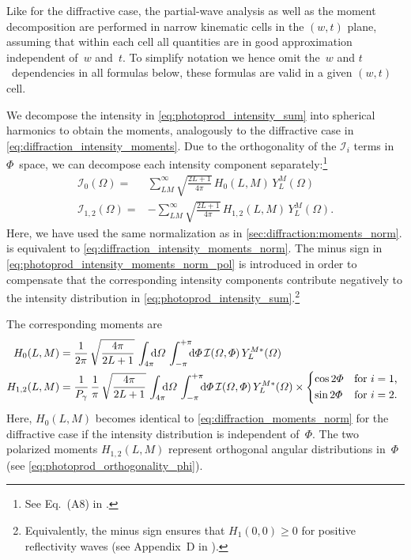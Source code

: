 Like for the diffractive case, the partial-wave analysis as well as
the moment decomposition are performed in narrow kinematic cells in
the $(w, t)$ plane, assuming that within each cell all quantities are
in good approximation independent of~$w$ and~$t$.  To simplify
notation we hence omit the~$w$ and $t$~dependencies in all formulas
below, \ie these formulas are valid in a given $(w, t)$ cell.

We decompose the intensity in \cref{eq:photoprod_intensity_sum} into
spherical harmonics to obtain the moments, analogously to the
diffractive case in \cref{eq:diffraction_intensity_moments}.  Due to
the orthogonality of the $\mathcal{I}_i$ terms in $\Phi$~space, we can
decompose each intensity component separately:\footnote{See Eq.~(A8)
in .}
\begin{align}
  \label{eq:photoprod_intensity_moments_norm_unpol}
  \mathcal{I}_0(\Omega)
  ={}& \sum_{L M}^\infty \sqrt{\frac{2 L + 1}{4 \pi}}\, H_0(L, M)\, Y_L^M(\Omega)
  \\
  \label{eq:photoprod_intensity_moments_norm_pol}
  \mathcal{I}_{1, 2}(\Omega)
  ={}& -\sum_{L M}^\infty \sqrt{\frac{2 L + 1}{4 \pi}}\, H_{1, 2}(L, M)\, Y_L^M(\Omega).
\end{align}
Here, we have used the same normalization as in
\cref{sec:diffraction:moments_norm}.
 is equivalent to
\cref{eq:diffraction_intensity_moments_norm}.  The minus sign in
\cref{eq:photoprod_intensity_moments_norm_pol} is introduced in order
to compensate that the corresponding intensity components contribute
negatively to the intensity distribution in
\cref{eq:photoprod_intensity_sum}.\footnote{Equivalently, the minus
sign ensures that $H_1(0, 0) \geq 0$ for positive reflectivity waves
(see Appendix~D in ).}

The corresponding moments are
\begin{align}
  \label{eq:photoprod_moments_norm_unpol}
  H_0(L, M)
  ={}& \frac{1}{2 \pi}\, \sqrt{\frac{4 \pi}{2 L + 1}}\, \int_{4 \pi}\!\!\! \dif{\Omega}\, \int_{-\pi}^{+\pi}\!\!\! \dif{\Phi}\,
  \mathcal{I}(\Omega, \Phi)\, Y_L^{M *}(\Omega)
  \\
  \label{eq:photoprod_moments_norm_pol}
  H_{1, 2}(L, M)
  ={}& \frac{1}{P_\gamma}\, \frac{1}{\pi}\, \sqrt{\frac{4 \pi}{2 L + 1}}\, \int_{4 \pi}\!\!\! \dif{\Omega}\, \int_{-\pi}^{+\pi}\!\!\! \dif{\Phi}\,
  \mathcal{I}(\Omega, \Phi)\, Y_L^{M *}(\Omega) \times \begin{cases*}
    \cos 2 \Phi & for $i = 1$, \\
    \sin 2 \Phi & for $i = 2$.
  \end{cases*}
\end{align}
Here, $H_0(L, M)$ becomes identical to
\cref{eq:diffraction_moments_norm} for the diffractive case if the
intensity distribution is independent of~$\Phi$.  The two polarized
moments $H_{1, 2}(L, M)$ represent orthogonal angular distributions
in~$\Phi$ (see \cref{eq:photoprod_orthogonality_phi}).


